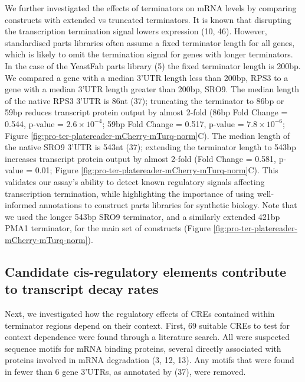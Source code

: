 \documentclass{SBCbookchapter}
\begin{document}
We further investigated the effects of terminators on mRNA levels by comparing constructs with extended vs truncated terminators.
It is known that disrupting the transcription termination signal lowers expression (10, 46).
However, standardised parts libraries often assume a fixed terminator length for all genes, which is likely to omit the termination signal for genes with longer terminators.
In the case of the YeastFab parts library (5) the fixed terminator length is 200bp.
We compared a gene with a median 3'UTR length less than 200bp, RPS3 to a gene with a median 3'UTR length greater than 200bp, SRO9.
The median length of the native RPS3 3'UTR is 86nt (37); truncating the terminator to 86bp or 59bp reduces transcript protein output by almost 2-fold (86bp Fold Change = 0.544, p-value = \(2.6 \times 10^{-4}\); 59bp Fold Change = 0.517, p-value = \(7.8 \times 10^{-6}\); Figure \ref{fig:pro-ter-platereader-mCherry-mTurq-norm}C).
The median length of the native SRO9 3'UTR is 543nt (37); extending the terminator length to 543bp increases transcript protein output by almost 2-fold (Fold Change = 0.581, p-value = 0.01; Figure \ref{fig:pro-ter-platereader-mCherry-mTurq-norm}C).
This validates our assay's ability to detect known regulatory signals affecting transcription termination, while highlighting the importance of using well-informed annotations to construct parts libraries for synthetic biology.
Note that we used the longer 543bp SRO9 terminator, and a similarly extended 421bp PMA1 terminator, for the main set of constructs (Figure \ref{fig:pro-ter-platereader-mCherry-mTurq-norm}).

\subsection{Candidate cis-regulatory elements contribute to transcript decay rates}

Next, we investigated how the regulatory effects of CREs contained within terminator regions depend on their context.
First, 69 suitable CREs to test for context dependence were found through a literature search.
All were suspected sequence motifs for mRNA binding proteins, several directly associated with proteins involved in mRNA degradation (3, 12, 13).
Any motifs that were found in fewer than 6 gene 3'UTRs, as annotated by (37), were removed.
\end{document}
